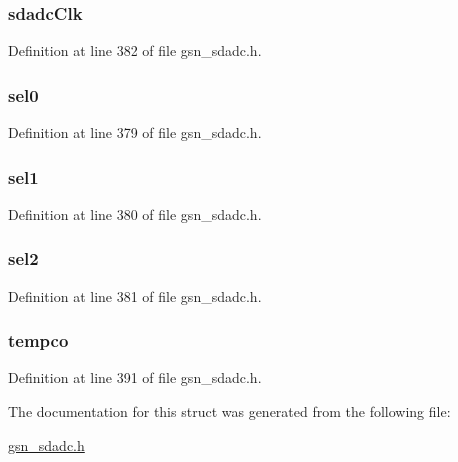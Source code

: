 \hypertarget{a00213_a3d39458493da690814b673844c20744e}{
\subsubsection[{sdadcClk}]{ {\bf sdadcClk}}}
\label{a00213_a3d39458493da690814b673844c20744e}


Definition at line 382 of file gsn\_\-sdadc.h.

\hypertarget{a00213_a26c20ee3ed05a076f49a8e5a651490e7}{
\subsubsection[{sel0}]{ {\bf sel0}}}
\label{a00213_a26c20ee3ed05a076f49a8e5a651490e7}


Definition at line 379 of file gsn\_\-sdadc.h.

\hypertarget{a00213_a56264ad77b6d679a8ea0f6c6d06ee3ee}{
\subsubsection[{sel1}]{ {\bf sel1}}}
\label{a00213_a56264ad77b6d679a8ea0f6c6d06ee3ee}


Definition at line 380 of file gsn\_\-sdadc.h.

\hypertarget{a00213_a2e821b5cf1abb02f5f69c3f583296ac6}{
\subsubsection[{sel2}]{ {\bf sel2}}}
\label{a00213_a2e821b5cf1abb02f5f69c3f583296ac6}


Definition at line 381 of file gsn\_\-sdadc.h.

\hypertarget{a00213_a8709e7f98588a98949c72e3e42f6ef85}{
\subsubsection[{tempco}]{ {\bf tempco}}}
\label{a00213_a8709e7f98588a98949c72e3e42f6ef85}


Definition at line 391 of file gsn\_\-sdadc.h.



The documentation for this struct was generated from the following file:\begin{DoxyCompactItemize}
\item 
\hyperlink{a00583}{gsn\_\-sdadc.h}\end{DoxyCompactItemize}
